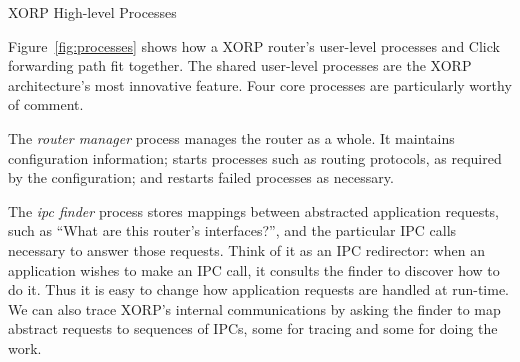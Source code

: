
\begin{floatingfigure}[l]{3.0in} %
\centerline{}
\caption{XORP High-level Processes}
\label{fig:processes}
\vspace{-0.1in}
\end{floatingfigure}

Figure~\ref{fig:processes} shows how a XORP router's user-level processes
and Click forwarding path fit together.
The shared user-level processes are the XORP architecture's most innovative
feature. Four core processes are particularly worthy of comment.

The \emph{router manager}
process manages the router as a whole.  It maintains
configuration information; starts processes such as routing
protocols, as required by the configuration; and restarts failed
processes as necessary.

The \emph{ipc finder} process stores mappings between abstracted application
requests, such as ``What are this router's interfaces?'', and the
particular IPC calls necessary to answer those requests.
Think of it as an IPC redirector:
when an application wishes to make an IPC
call, it consults the finder to discover how to do it.  Thus it is easy to change
how application requests are handled at run-time.  We
can also trace XORP's internal communications by asking the finder to map
abstract requests to sequences of IPCs, some for tracing and some for
doing the work.  


